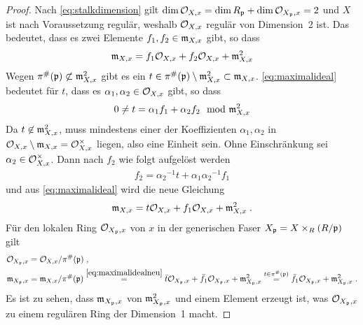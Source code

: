 \begin{Lemma}
\begin{proof}
    Nach \autoref{eq:stalkdimension} gilt
    ${\dim\mathcal{O}_{X,x}=\dim R_{\mathfrak{p}}+\dim\mathcal{O}_{X_{\mathfrak{p}},x}=2}$ und $X$ ist nach
    Voraussetzung regulär, weshalb $\mathcal{O}_{X,x}$ regulär von Dimension~2
    ist. Das bedeutet, dass es zwei Elemente $f_1, {f_2\in\mathfrak{m}_{X,x}}$
    gibt, so dass
    \begin{gather}\label{eq:maximalideal}
      \mathfrak{m}_{X,x} = f_1\mathcal{O}_{X,x} + f_2\mathcal{O}_{X,x} + \mathfrak{m}_{X,x}^2
    \end{gather}
    Wegen ${\pi^\#(\mathfrak{p})\not\subset\mathfrak{m}_{X,x}^2}$ gibt es ein
    ${t\in\pi^\#(\mathfrak{p})\setminus\mathfrak{m}_{X,x}^2\subset\mathfrak{m}_{X,x}}$.
    \autoref{eq:maximalideal} bedeutet für $t$, dass es $\alpha_1,
    {\alpha_2\in\mathcal{O}_{X,x}}$ gibt, so dass
    \begin{gather*}
      0 \neq t = \alpha_1 f_1 + \alpha_2 f_2 \mod {\mathfrak{m}}_{X,x}^2
    \end{gather*}
    Da $t\not\in\mathfrak{m}_{X,x}^2$, muss mindestens einer der Koeffizienten
    $\alpha_1,\alpha_2$ in $\mathcal{O}_{X,x}\setminus\mathfrak{m}_{X,x}=\mathcal{O}_{X,x}^\times$
    liegen, also eine Einheit sein. Ohne Einschränkung sei
    $\alpha_2\in\mathcal{O}_{X,x}^\times$. Dann nach $f_2$ wie folgt
    aufgelöst werden
    \begin{gather*}
      f_2 = {\alpha_2}^{-1}t + {\alpha_1}{\alpha_2}^{-1}f_1 
    \end{gather*}
    und aus \eqref{eq:maximalideal} wird die neue Gleichung
    \begin{gather}\label{eq:maximalidealneu}
      \mathfrak{m}_{X,x} = t\mathcal{O}_{X,x} + f_1\mathcal{O}_{X,x} + \mathfrak{m}_{X,x}^2\;.
    \end{gather}
    Für den lokalen Ring $\mathcal{O}_{X_{\mathfrak{p}},x}$ von $x$ in der generischen
    Faser ${X_{\mathfrak{p}} = X\times_R (R/\mathfrak{p})}$ gilt
    \begin{align*}
      \mathcal{O}_{X_{\mathfrak{p}},x} &= \mathcal{O}_{X,x}/\pi^\#(\mathfrak{p})\;,\\
      \mathfrak{m}_{X_{\mathfrak{p}},x} &= \mathfrak{m}_{X,x}/\pi^\#(\mathfrak{p})
                    \overset{\eqref{eq:maximalidealneu}}{=}
                    \bar t\mathcal{O}_{X_{\mathfrak{p}},x} + \bar f_1\mathcal{O}_{X_{\mathfrak{p}},x} +
                    \mathfrak{m}_{X_{\mathfrak{p}},x}^2
                    \overset{t\in\pi^\#(\mathfrak{p})}{=}
                    \bar f_1\mathcal{O}_{X_{\mathfrak{p}},x} + \mathfrak{m}_{X_{\mathfrak{p}},x}^2 \;.
    \end{align*}
    Es ist zu sehen, dass $\mathfrak{m}_{X_{\mathfrak{p}},x}$ von $\mathfrak{m}_{X_{\mathfrak{p}},x}^2$ und einem Element
    erzeugt ist, was $\mathcal{O}_{X_{\mathfrak{p}},x}$ zu einem regulären Ring der Dimension~1
    macht.
  \end{proof}
\end{Lemma}

